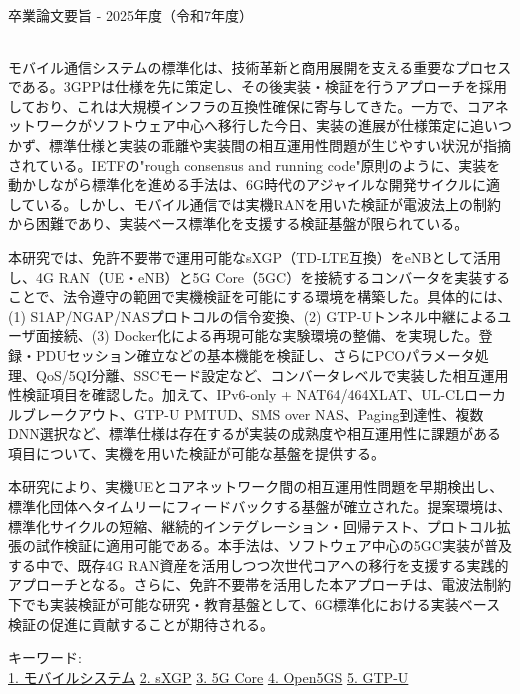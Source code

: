 卒業論文要旨 - 2025年度（令和7年度）
\begin{center}
\begin{large}
\end{large}
\end{center}
\begin{spacing}{1.2}
\small
モバイル通信システムの標準化は、技術革新と商用展開を支える重要なプロセスである。3GPPは仕様を先に策定し、その後実装・検証を行うアプローチを採用しており、これは大規模インフラの互換性確保に寄与してきた。一方で、コアネットワークがソフトウェア中心へ移行した今日、実装の進展が仕様策定に追いつかず、標準仕様と実装の乖離や実装間の相互運用性問題が生じやすい状況が指摘されている。IETFの"rough consensus and running code"原則のように、実装を動かしながら標準化を進める手法は、6G時代のアジャイルな開発サイクルに適している。しかし、モバイル通信では実機RANを用いた検証が電波法上の制約から困難であり、実装ベース標準化を支援する検証基盤が限られている。

本研究では、免許不要帯で運用可能なsXGP（TD-LTE互換）をeNBとして活用し、4G RAN（UE・eNB）と5G Core（5GC）を接続するコンバータを実装することで、法令遵守の範囲で実機検証を可能にする環境を構築した。具体的には、(1) S1AP/NGAP/NASプロトコルの信令変換、(2) GTP-Uトンネル中継によるユーザ面接続、(3) Docker化による再現可能な実験環境の整備、を実現した。登録・PDUセッション確立などの基本機能を検証し、さらにPCOパラメータ処理、QoS/5QI分離、SSCモード設定など、コンバータレベルで実装した相互運用性検証項目を確認した。加えて、IPv6-only + NAT64/464XLAT、UL-CLローカルブレークアウト、GTP-U PMTUD、SMS over NAS、Paging到達性、複数DNN選択など、標準仕様は存在するが実装の成熟度や相互運用性に課題がある項目について、実機を用いた検証が可能な基盤を提供する。

本研究により、実機UEとコアネットワーク間の相互運用性問題を早期検出し、標準化団体へタイムリーにフィードバックする基盤が確立された。提案環境は、標準化サイクルの短縮、継続的インテグレーション・回帰テスト、プロトコル拡張の試作検証に適用可能である。本手法は、ソフトウェア中心の5GC実装が普及する中で、既存4G RAN資産を活用しつつ次世代コアへの移行を支援する実践的アプローチとなる。さらに、免許不要帯を活用した本アプローチは、電波法制約下でも実装検証が可能な研究・教育基盤として、6G標準化における実装ベース検証の促進に貢献することが期待される。

\end{spacing}

キーワード:\\
\underline{1. モバイルシステム}
\underline{2. sXGP}
\underline{3. 5G Core}
\underline{4. Open5GS}
\underline{5. GTP-U}
\begin{flushright}
\dept \\
\author
\end{flushright}
